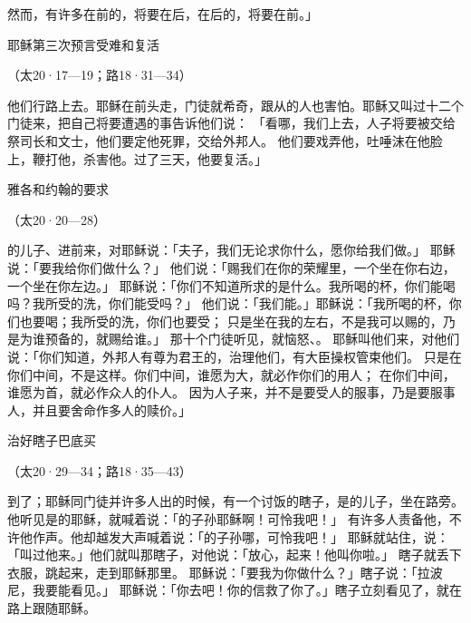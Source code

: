 {然而，有许多在前的，将要在后，在后的，将要在前。」
\par }{\SH 耶稣第三次预言受难和复活
\par }{\R （太20·17—19；路18·31—34）
\par }{\PP {}他们行路上{}去。耶稣在前头走，门徒就希奇，跟从的人也害怕。耶稣又叫过十二个门徒来，把自己将要遭遇的事告诉他们说：
「看哪，我们上{}去，人子将要被交给祭司长和文士，他们要定他死罪，交给外邦人。
他们要戏弄他，吐唾沫在他脸上，鞭打他，杀害他。过了三天，他要复活。」
\par }{\SH 雅各和约翰的要求
\par }{\R （太20·20—28）
\par }{\PP {}的儿子{}、{}进前来，对耶稣说：「夫子，我们无论求你什么，愿你给我们做。」
耶稣说：「要我给你们做什么？」
他们说：「赐我们在你的荣耀里，一个坐在你右边，一个坐在你左边。」
耶稣说：「你们不知道所求的是什么。我所喝的杯，你们能喝吗？我所受的洗，你们能受吗？」
他们说：「我们能。」耶稣说：「我所喝的杯，你们也要喝；我所受的洗，你们也要受；
只是坐在我的左右，不是我可以赐的，乃是为谁预备的，就赐给谁。」
那十个门徒听见，就恼怒{}、{}。
耶稣叫他们来，对他们说：「你们知道，外邦人有尊为君王的，治理他们，有大臣操权管束他们。
只是在你们中间，不是这样。你们中间，谁愿为大，就必作你们的用人；
在你们中间，谁愿为首，就必作众人的仆人。
因为人子来，并不是要受人的服事，乃是要服事人，并且要舍命作多人的赎价。」
\par }{\SH 治好瞎子巴底买
\par }{\R （太20·29—34；路18·35—43）
\par }{\PP {}到了{}；耶稣同门徒并许多人出{}的时候，有一个讨饭的瞎子，是{}的儿子{}，坐在路旁。
他听见是{}的耶稣，就喊着说：「{}的子孙耶稣啊！可怜我吧！」
有许多人责备他，不许他作声。他却越发大声喊着说：「{}的子孙哪，可怜我吧！」
耶稣就站住，说：「叫过他来。」他们就叫那瞎子，对他说：「放心，起来！他叫你啦。」
瞎子就丢下衣服，跳起来，走到耶稣那里。
耶稣说：「要我为你做什么？」瞎子说：「拉波尼，我要能看见。」
耶稣说：「你去吧！你的信救了你了。」瞎子立刻看见了，就在路上跟随耶稣。

}
